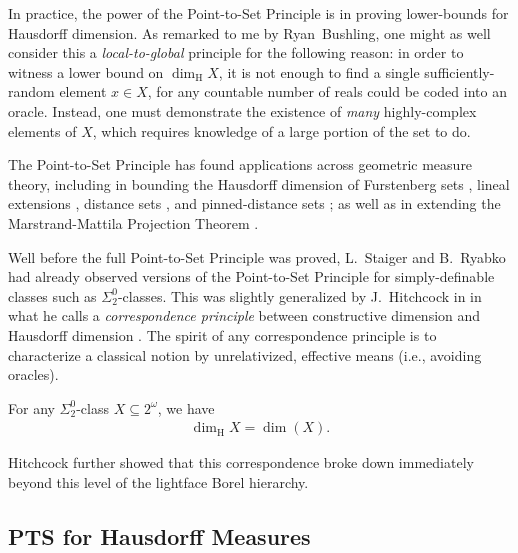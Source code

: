 
In practice, the power of the Point-to-Set Principle is in proving lower-bounds for Hausdorff dimension. As remarked to me by Ryan~Bushling, one might as well consider this a \textit{local-to-global} principle for the following reason: in order to witness a lower bound on $\dim_{\operatorname{H}}X$, it is not enough to find a single sufficiently-random element $x \in X$, for any countable number of reals could be coded into an oracle. Instead, one must demonstrate the existence of \textit{many} highly-complex elements of $X$, which requires knowledge of a large portion of the set to do. 

The Point-to-Set Principle has found applications across geometric measure theory, including in bounding the Hausdorff dimension of Furstenberg sets \cite{LS16, Stu18}, lineal extensions \cite{BF25}, distance sets \cite{ABW23}, and pinned-distance sets \cite{Stu22_pinned}; as well as in extending the Marstrand-Mattila Projection Theorem \cite{Stu21}. 

Well before the full Point-to-Set Principle was proved, L.~Staiger \cite{Sta89} and B.~Ryabko \cite{Rya93, Rya94} had already observed versions of the Point-to-Set Principle for simply-definable classes such as $\Sigma^0_2$-classes. This was slightly generalized by J.~Hitchcock in \cite{Hit05} in what he calls a \textit{correspondence principle} between constructive dimension and Hausdorff dimension \cite{Hit05}. The spirit of any correspondence principle is to characterize a classical notion by unrelativized, effective means (i.e., avoiding oracles). 
 
\begin{theorem}
    \label{theorem:correspondence_principle_for_H_dimension}
     For any $\Sigma^0_2$-class $X \subseteq 2^\omega$, we have
     \begin{align*}
         \dim_{\operatorname{H}} X = \dim(X).
     \end{align*}
\end{theorem}

Hitchcock further showed that this correspondence broke down immediately beyond this level of the lightface Borel hierarchy. 

\subsection{PTS for Hausdorff Measures}

